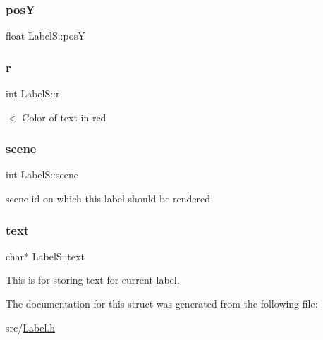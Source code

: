 \mbox{\label{struct_label_s_aecee8df1e219856073e5616ed2eed4aa}} 
\subsubsection{\texorpdfstring{posY}{posY}}
{\footnotesize\ttfamily float Label\+S\+::posY}

\mbox{\label{struct_label_s_a3ec33a64903b7195fa8c2b841e3b61ab}} 
\subsubsection{\texorpdfstring{r}{r}}
{\footnotesize\ttfamily int Label\+S\+::r}

$<$ Color of text in red \mbox{\label{struct_label_s_acf66945613bec08104da45a8f82914b3}} 
\subsubsection{\texorpdfstring{scene}{scene}}
{\footnotesize\ttfamily int Label\+S\+::scene}



scene id on which this label should be rendered 

\mbox{\label{struct_label_s_a6065a333c62b5a09d13324f4c876d18c}} 
\subsubsection{\texorpdfstring{text}{text}}
{\footnotesize\ttfamily char$\ast$ Label\+S\+::text}



This is for storing text for current label. 



The documentation for this struct was generated from the following file\+:\begin{DoxyCompactItemize}
\item 
src/\hyperlink{_label_8h}{Label.\+h}\end{DoxyCompactItemize}
